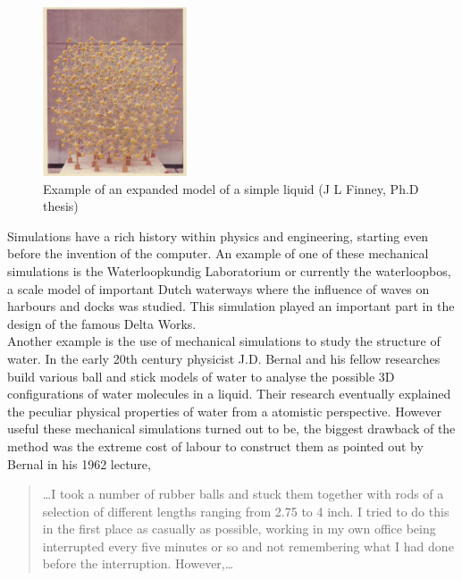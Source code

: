 \begin{figure}
  \begin{center}
    \includegraphics[width=0.38\textwidth]{Figures/WaterModel.png}
  \end{center}
  \caption{Example of an expanded model of a simple liquid (J L Finney, Ph.D thesis)}
\end{figure}

Simulations have a rich history within physics and engineering, starting even before the
invention of the computer. An example of one of these mechanical simulations is the
 Waterloopkundig Laboratorium or currently the waterloopbos, a scale model of important
Dutch waterways where the influence of waves on harbours and docks was studied. This
simulation played an important part in the design of the famous Delta Works.\\
Another example is the use of mechanical simulations to study the structure of water. In
the early 20th century physicist J.D. Bernal and his fellow researches build various ball
and stick models of water to analyse the possible 3D configurations of water molecules in
a liquid. Their research eventually explained the peculiar physical properties
of water from a atomistic perspective. However useful these mechanical simulations turned
out to be, the biggest drawback of the method was the extreme cost of labour to construct
them as pointed out by Bernal in his 1962 lecture,

\begin{quote}
\dots I took a number of rubber balls and stuck them together with rods of a
selection of different lengths ranging from 2.75 to 4 inch. I tried to do this in the
first place as casually as possible, working in my own office being interrupted every
five minutes or so and not remembering what I had done before the interruption.
However,\dots
\end{quote}

